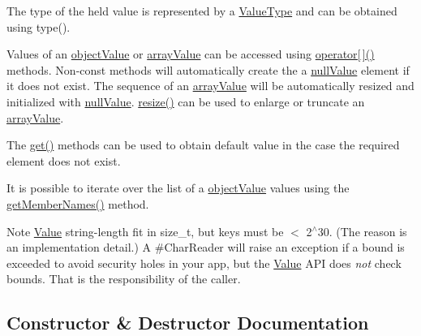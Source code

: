 The type of the held value is represented by a \hyperlink{namespaceJson_a7d654b75c16a57007925868e38212b4e}{Value\+Type} and can be obtained using type().

Values of an \hyperlink{namespaceJson_a7d654b75c16a57007925868e38212b4eae8386dcfc36d1ae897745f7b4f77a1f6}{object\+Value} or \hyperlink{namespaceJson_a7d654b75c16a57007925868e38212b4eadc8f264f36b55b063c78126b335415f4}{array\+Value} can be accessed using \hyperlink{classJson_1_1Value_a7d99f5dba388cdaa152ce6ef933d64ef}{operator\mbox{[}$\,$\mbox{]}()} methods. Non-\/const methods will automatically create the a \hyperlink{namespaceJson_a7d654b75c16a57007925868e38212b4ea7d9899633b4409bd3fc107e6737f8391}{null\+Value} element if it does not exist. The sequence of an \hyperlink{namespaceJson_a7d654b75c16a57007925868e38212b4eadc8f264f36b55b063c78126b335415f4}{array\+Value} will be automatically resized and initialized with \hyperlink{namespaceJson_a7d654b75c16a57007925868e38212b4ea7d9899633b4409bd3fc107e6737f8391}{null\+Value}. \hyperlink{classJson_1_1Value_a7a064d8aa47fde09a268be2aea992134}{resize()} can be used to enlarge or truncate an \hyperlink{namespaceJson_a7d654b75c16a57007925868e38212b4eadc8f264f36b55b063c78126b335415f4}{array\+Value}.

The \hyperlink{classJson_1_1Value_a034eb7bf85a44fa759bdaa232788ca66}{get()} methods can be used to obtain default value in the case the required element does not exist.

It is possible to iterate over the list of a \hyperlink{namespaceJson_a7d654b75c16a57007925868e38212b4eae8386dcfc36d1ae897745f7b4f77a1f6}{object\+Value} values using the \hyperlink{classJson_1_1Value_a79d7725dce6260317333e69022367ac9}{get\+Member\+Names()} method.

\begin{DoxyNote}{Note}
\hyperlink{classJson_1_1Value_ada6ba1369448fb0240bccc36efaa46f7}{Value} string-\/length fit in size\+\_\+t, but keys must be $<$ 2$^\wedge$30. (The reason is an implementation detail.) A \#\+Char\+Reader will raise an exception if a bound is exceeded to avoid security holes in your app, but the \hyperlink{classJson_1_1Value}{Value} A\+PI does {\itshape not} check bounds. That is the responsibility of the caller. 
\end{DoxyNote}


\subsection{Constructor \& Destructor Documentation}
\mbox{\label{classJson_1_1Value_ada6ba1369448fb0240bccc36efaa46f7}} 
